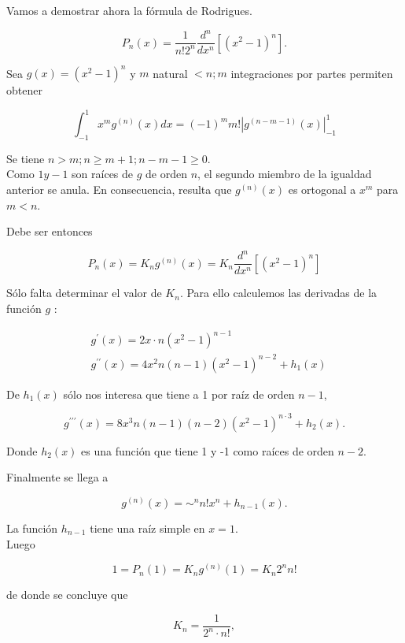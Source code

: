 \documentclass[10pt]{article}
\theoremstyle{plain}
\theoremstyle{definition}
\theoremstyle{remark}
\begin{document}
Vamos a demostrar ahora la fórmula de Rodrigues.


\begin{equation*}
P_{n}(x)=\frac{1}{n!2^{n}} \frac{d^{n}}{d x^{n}}\left[\left(x^{2}-1\right)^{n}\right] . \tag{9-4}
\end{equation*}


Sea $g(x)=\left(x^{2}-1\right)^{n}$ y $m$ natural $<n ; m$ integraciones por partes permiten obtener

$$
\int_{-1}^{1} x^{m} g^{(n)}(x) d x=(-1)^{m} m!\left|g^{(n-m-1)}(x)\right|_{-1}^{1}
$$

Se tiene $n>m ; n \geqslant m+1 ; n-m-1 \geqslant 0$.\\
Como $1 y-1$ son raíces de $g$ de orden $n$, el segundo miembro de la igualdad anterior se anula. En consecuencia, resulta que $g^{(n)}(x)$ es ortogonal a $x^{m}$ para $m<n$.

Debe ser entonces


\begin{equation*}
P_{n}(x)=K_{n} g^{(n)}(x)=K_{n} \frac{d^{n}}{d x^{n}}\left[\left(x^{2}-1\right)^{n}\right] \tag{9-5}
\end{equation*}


Sólo falta determinar el valor de $K_{n}$. Para ello calculemos las derivadas de la función $g$ :

$$
\begin{aligned}
& g^{\prime}(x)=2 x \cdot n\left(x^{2}-1\right)^{n-1} \\
& g^{\prime \prime}(x)=4 x^{2} n(n-1)\left(x^{2}-1\right)^{n-2}+h_{1}(x)
\end{aligned}
$$

De $h_{1}(x)$ sólo nos interesa que tiene a 1 por raíz de orden $n-1$,

$$
g^{\prime \prime \prime}(x)=8 x^{3} n(n-1)(n-2)\left(x^{2}-1\right)^{n \cdot 3}+h_{2}(x) .
$$

Donde $h_{2}(x)$ es una función que tiene 1 y -1 como raíces de orden $n-2$.

Finalmente se llega a

$$
g^{(n)}(x)=\sim^{n} n!x^{n}+h_{n-1}(x) .
$$

La función $h_{n-1}$ tiene una raíz simple en $x=1$.\\
Luego

$$
1=P_{n}(1)=K_{n} g^{(n)}(1)=K_{n} 2^{n} n!
$$


de donde se concluye que

$$
K_{n}=\frac{1}{2^{n} \cdot n!},
$$
\end{document}
